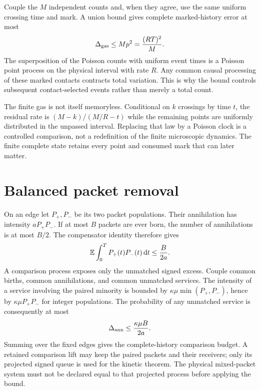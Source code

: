 Couple the $M$ independent counts and, when they agree, use the same uniform crossing time and mark. A union bound gives complete marked-history error at most
\begin{equation}\label{eq:appgas}
\Delta_{\rm gas}\le Mp^2=\frac{(RT)^2}{M}.
\end{equation}
The superposition of the Poisson counts with uniform event times is a Poisson point process on the physical interval with rate $R$. Any common causal processing of these marked contacts contracts total variation. This is why the bound controls subsequent contact-selected events rather than merely a total count.

The finite gas is not itself memoryless. Conditional on $k$ crossings by time $t$, the residual rate is $(M-k)/(M/R-t)$ while the remaining points are uniformly distributed in the unpassed interval. Replacing that law by a Poisson clock is a controlled comparison, not a redefinition of the finite microscopic dynamics. The finite complete state retains every point and consumed mark that can later matter.

\section{Balanced packet removal}\label{section:kinetic:balanced-packet-removal}
On an edge let $P_+,P_-$ be its two packet populations. Their annihilation has intensity $aP_+P_-$. If at most $B$ packets are ever born, the number of annihilations is at most $B/2$. The compensator identity therefore gives
\[
\mathbb E\int_0^T P_+(t)P_-(t)\,\mathrm d t\le\frac{B}{2a}.
\]
A comparison process exposes only the unmatched signed excess. Couple common births, common annihilations, and common unmatched services. The intensity of a service involving the paired minority is bounded by $\kappa\mu\min(P_+,P_-)$, hence by $\kappa\mu P_+P_-$ for integer populations. The probability of any unmatched service is consequently at most
\begin{equation}\label{eq:appann}
\Delta_{\rm ann}\le\frac{\kappa\mu B}{2a}.
\end{equation}
Summing over the fixed edges gives the complete-history comparison budget. A retained comparison lift may keep the paired packets and their receivers; only its projected signed queue is used for the kinetic theorem. The physical mixed-packet system must not be declared equal to that projected process before applying the bound.

